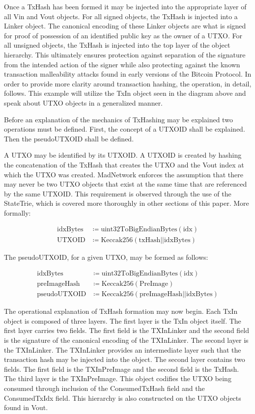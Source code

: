 Once a TxHash has been formed it may be injected into the appropriate layer of
all Vin and Vout objects.
For all signed objects, the TxHash is injected into a Linker object.
The canonical encoding of these Linker objects are what is signed for proof
of possession of an identified public key as the owner of a UTXO.
For all unsigned objects, the TxHash is injected into the top layer of the
object hierarchy.
This ultimately ensures protection against separation of the signature from the
intended action of the signer while also protecting against the known
transaction malleability attacks found in early versions of the Bitcoin
Protocol.
In order to provide more clarity around transaction hashing, the operation, in
detail, follows.
This example will utilize the TxIn object seen in the diagram above and speak
about UTXO objects in a generalized manner.

Before an explanation of the mechanics of TxHashing may be explained two
operations must be defined.
First, the concept of a UTXOID shall be explained.
Then the pseudoUTXOID shall be defined.

A UTXO may be identified by its UTXOID.
A UTXOID is created by hashing the concatenation of the TxHash that creates the
UTXO and the Vout index at which the UTXO was created.
MadNetwork enforces the assumption that there may never be two UTXO objects
that exist at the same time that are referenced by the same UTXOID.
This requirement is observed through the use of the StateTrie, which is covered
more thoroughly in other sections of this paper.
More formally:

\begin{align*}
    \text{idxBytes} &\coloneqq \text{uint32ToBigEndianBytes}(\text{idx}) \\
    \text{UTXOID} &\coloneqq \text{Keccak256}(\text{txHash}||\text{idxBytes})
\end{align*}

\noindent
The pseudoUTXOID, for a given UTXO, may be formed as follows:

\begin{align*}
    \text{idxBytes} &\coloneqq \text{uint32ToBigEndianBytes}(\text{idx}) \\
    \text{preImageHash} &\coloneqq \text{Keccak256}(\text{PreImage}) \\
    \text{pseudoUTXOID} &\coloneqq \text{Keccak256}(\text{preImageHash} ||
        \text{idxBytes})
\end{align*}

The operational explanation of TxHash formation may now begin.
Each TxIn object is composed of three layers.
The first layer is the TxIn object itself.
The first layer carries two fields.
The first field is the TXInLinker and the second field is the signature
of the canonical encoding of the TXInLinker.
The second layer is the TXInLinker.
The TXInLinker provides an intermediate layer such that the transaction
hash may be injected into the object.
The second layer contains two fields.
The first field is the TXInPreImage and the second field is the TxHash.
The third layer is the TXInPreImage.
This object codifies the UTXO being consumed through inclusion of the
ConsumedTxHash field and the ConsumedTxIdx field.
This hierarchy is also constructed on the UTXO objects found in Vout.


